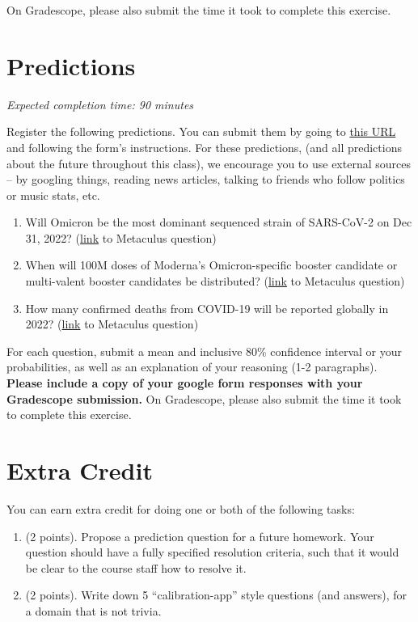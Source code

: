 \documentclass[11pt]{article}
\begin{document}
On Gradescope, please also submit the time it took to complete this exercise.

\section*{Predictions}

\emph{Expected completion time: 90 minutes}

Register the following predictions. You can submit them by going to \href{https://docs.google.com/forms/d/e/1FAIpQLSeMnjW4dLgLBFrIVr0n4-KjeakEj00KlN4PCfIRmHAvGj95kQ/viewform?usp=sf_link}{this URL} and following the form's instructions. For these predictions, (and all predictions about the future throughout this class), we encourage you to use external sources -- by googling things, reading news articles, talking to friends who follow politics or music stats, etc.

\begin{enumerate}
	\item Will Omicron be the most dominant sequenced strain of SARS-CoV-2 on Dec 31, 2022? (\href{https://www.metaculus.com/questions/8880/omicron-dominant-variant-dec-31-2022/}{link} to Metaculus question)
	\item When will 100M doses of Moderna's Omicron-specific booster candidate or multi-valent booster candidates be distributed? (\href{https://www.metaculus.com/questions/8767/date-100m-doses-omicron-booster-distributed/}{link} to Metaculus question)
	\item How many confirmed deaths from COVID-19 will be reported globally in 2022? (\href{https://www.metaculus.com/questions/8307/global-confirmed-covid-19-deaths-in-2022/}{link} to Metaculus question)
\end{enumerate}

For each question, submit a mean and inclusive 80\% confidence interval or your probabilities, as well as an explanation of your reasoning (1-2 paragraphs). \textbf{Please include a copy of your google form responses with your Gradescope submission.} On Gradescope, please also submit the time it took to complete this exercise.

\section*{Extra Credit}

You can earn extra credit for doing one or both of the following tasks:
\begin{enumerate}
\item (2 points). Propose a prediction question for a future homework. Your question should have a fully specified resolution criteria, 
      such that it would be clear to the course staff how to resolve it.
\item (2 points). Write down 5 ``calibration-app'' style questions (and answers), for a domain that is not trivia.
\end{enumerate}
\end{document}
